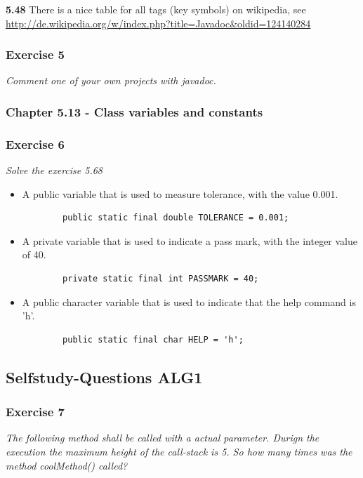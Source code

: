 \textbf{5.48} There is a nice table for all tags (key symbols) on wikipedia,
see \url{http://de.wikipedia.org/w/index.php?title=Javadoc&oldid=124140284}

\subsubsection*{Exercise 5}
\textit{Comment one of your own projects with javadoc.} \\



\subsubsection{Chapter 5.13 - Class variables and constants}

\subsubsection*{Exercise 6}
\textit{Solve the exercise 5.68} \\
\begin{itemize}
	\item A public variable that is used to measure tolerance, with the value 0.001. \\
		\begin{lstlisting}
		public static final double TOLERANCE = 0.001;
		\end{lstlisting}
	\item A private variable that is used to indicate a pass mark, with the integer value of 40.
		\begin{lstlisting}
		private static final int PASSMARK = 40;
		\end{lstlisting}
	\item A public character variable that is used to indicate that the help command is 'h'.
		\begin{lstlisting}
		public static final char HELP = 'h';
		\end{lstlisting}
\end{itemize}

\subsection{Selfstudy-Questions ALG1}

\subsubsection*{Exercise 7}
\textit{The following method shall be called with a actual parameter.
Durign the execution the maximum height of the call-stack is 5.
So how many times was the method coolMethod() called?} \\

